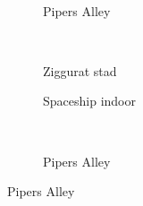 \begin{figure}[t]
\begin{minipage}[t]{0.5\textwidth}
\begin{adjustbox}{minipage=\textwidth, scale=0.55}
\begin{subfigure}[b]{1.6\textwidth}
      \label{fig:hs-ns-memory:indoor}
    \end{subfigure}
  \end{adjustbox} \\
  \begin{adjustbox}{minipage=\textwidth, scale=0.55}
    \begin{subfigure}[b]{1.6\textwidth}
      \centering
      \def\svgwidth{\textwidth}
      
      \caption{Pipers Alley}
      \vspace{4pt}
      \label{fig:hs-ns-memory:alley}
    \end{subfigure}
  \end{adjustbox} \\
  \begin{adjustbox}{minipage=\textwidth, scale=0.55}
    \begin{subfigure}[b]{1.6\textwidth}
      \centering
      \def\svgwidth{\textwidth}
      
      \caption{Ziggurat stad}
      \label{fig:hs-ns-memory:city}
    \end{subfigure}
  \end{adjustbox}
  \caption{\small Gesommeerde aantal pixels van de Hashed Shading datastructuren.}
  \label{fig:hs-ns-memory}
  \end{minipage}%
  \begin{minipage}[t]{0.5\textwidth}
  \begin{adjustbox}{minipage=\textwidth, scale=0.55}
    \begin{subfigure}[b]{1.6\textwidth}
      \centering
      \def\svgwidth{\textwidth}
      
      \caption{Spaceship indoor}
      \vspace{4pt}
      \label{fig:hs-ns-light-indices:indoor}
    \end{subfigure}
  \end{adjustbox} \\
  \begin{adjustbox}{minipage=\textwidth, scale=0.55}
    \begin{subfigure}[b]{1.6\textwidth}
      \centering
      \def\svgwidth{\textwidth}
      
      \caption{Pipers Alley}
      \vspace{4pt}
      \label{fig:hs-ns-light-indices:alley}
    \end{subfigure}

\end{adjustbox}
\end{minipage}
\end{figure}
